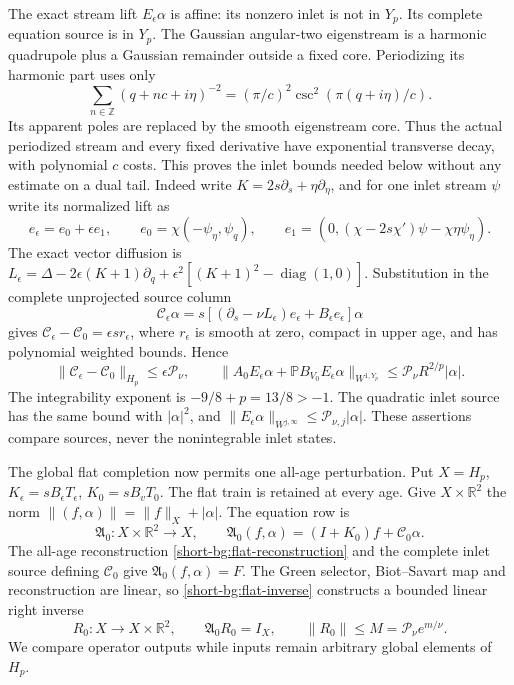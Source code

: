 The exact stream lift $E_\epsilon\alpha$ is affine: its nonzero
inlet is not in $Y_p$. Its complete equation source is in $Y_p$.
The Gaussian angular-two eigenstream is a harmonic quadrupole plus
a Gaussian remainder outside a fixed core. Periodizing its harmonic
part uses only
\[
 \sum_{n\in\mathbb Z}(q+nc+i\eta)^{-2}
       =(\pi/c)^2\csc^2(\pi(q+i\eta)/c).
\]
Its apparent poles are replaced by the smooth eigenstream core. Thus
the actual periodized stream and every fixed derivative have
exponential transverse decay, with polynomial $c$ costs. This proves
the inlet bounds needed below without any estimate on a dual tail.
Indeed write $K=2s\partial_s+\eta\partial_\eta$, and for one inlet
stream $\psi$ write its normalized lift as
\[
 e_\epsilon=e_0+\epsilon e_1,\qquad
 e_0=\chi(-\psi_\eta,\psi_q),\qquad
 e_1=(0,(\chi-2s\chi')\psi-\chi\eta\psi_\eta).
\]
The exact vector diffusion is
$L_\epsilon=\Delta-2\epsilon(K+1)\partial_q
+\epsilon^2[(K+1)^2-\operatorname{diag}(1,0)]$.
Substitution in the complete unprojected source column
\[
 \mathcal C_\epsilon\alpha
 =s[(\partial_s-\nu L_\epsilon)e_\epsilon+B_\epsilon e_\epsilon]\alpha
\]
gives $\mathcal C_\epsilon-\mathcal C_0=\epsilon s r_\epsilon$,
where $r_\epsilon$ is smooth at zero, compact in upper age, and has
polynomial weighted bounds. Hence
\begin{equation}
 \|\mathcal C_\epsilon-\mathcal C_0\|_{H_p}\le\epsilon\mathcal P_\nu,
 \qquad
 \|A_0E_\epsilon\alpha+\mathbb PB_{V_0}E_\epsilon\alpha\|_{W^{1,Y_p}}
 \le\mathcal P_\nu R^{2/p}|\alpha|.
 \label{short-bg:affine}
\end{equation}
The integrability exponent is $-9/8+p=13/8>-1$. The quadratic
inlet source has the same bound with $|\alpha|^2$, and
$\|E_\epsilon\alpha\|_{W^{j,\infty}}\le\mathcal P_{\nu,j}|\alpha|$.
These assertions compare sources, never the nonintegrable inlet states.

The global flat completion now permits one all-age perturbation. Put
$X=H_p$, $K_\epsilon=sB_\epsilon T_\epsilon$,
$K_0=sB_vT_0$. The flat train is retained at every age. Give
$X\times\mathbb R^2$ the norm $\|(f,\alpha)\|=\|f\|_X+|\alpha|$.
The equation row is
\[
 \mathfrak A_0:X\times\mathbb R^2\longrightarrow X,\qquad
 \mathfrak A_0(f,\alpha)=(I+K_0)f+\mathcal C_0\alpha.
\]
The all-age reconstruction \eqref{short-bg:flat-reconstruction}
and the complete inlet source defining $\mathcal C_0$ give
$\mathfrak A_0(f,\alpha)=F$. The Green selector, Biot--Savart map
and reconstruction are linear, so \eqref{short-bg:flat-inverse}
constructs a bounded linear right inverse
\[
 R_0:X\longrightarrow X\times\mathbb R^2,\qquad
 \mathfrak A_0R_0=I_X,\qquad
 \|R_0\|\le M=\mathcal P_\nu e^{m/\nu}.
\]
We compare operator outputs while inputs remain arbitrary global
elements of $H_p$.

